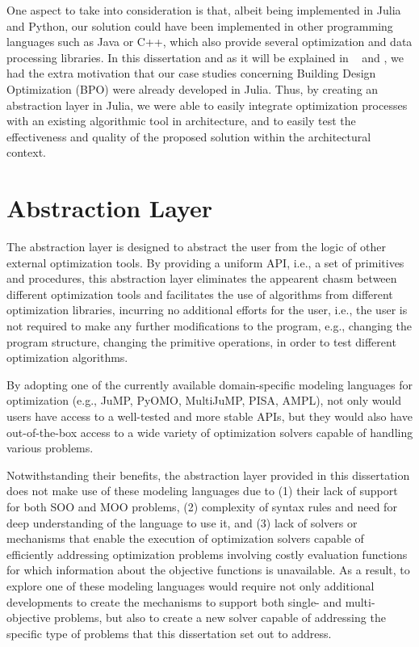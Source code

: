 One aspect to take into consideration is that, albeit being implemented in Julia and Python, our solution could have been implemented in other programming languages such as Java or C++, which also provide several optimization and data processing libraries. In this dissertation and as it will be explained in ~ and , we had the extra motivation that our case studies concerning Building Design Optimization (BPO) were already developed in Julia. Thus, by creating an abstraction layer in Julia, we were able to easily integrate optimization processes with an existing algorithmic tool in architecture, and to easily test the effectiveness and quality of the proposed solution within the architectural context. 

\section{Abstraction Layer}

The abstraction layer is designed to abstract the user from the logic of other external optimization tools. By providing a uniform \ac{API}, i.e., a set of primitives and procedures, this abstraction layer eliminates the appearent chasm between different optimization tools and facilitates the use of algorithms from different optimization libraries, incurring no additional efforts for the user, i.e., the user is not required to make any further modifications to the program, e.g., changing the program structure, changing the primitive operations, in order to test different optimization algorithms. 

By adopting one of the currently available domain-specific modeling languages for optimization (e.g., JuMP, PyOMO, MultiJuMP, PISA, AMPL), not only would users have access to a well-tested and more stable \acp{API}, but they would also have out-of-the-box access to a wide variety of optimization solvers capable of handling various problems. 

Notwithstanding their benefits, the abstraction layer provided in this dissertation does not make use of these modeling languages due to (1) their lack of support for both \ac{SOO} and \ac{MOO} problems, (2) complexity of syntax rules and need for deep understanding of the language to use it, and (3) lack of solvers or mechanisms that enable the execution of optimization solvers capable of efficiently addressing optimization problems involving costly evaluation functions for which information about the objective functions is unavailable. As a result, to explore one of these modeling languages would require not only additional developments to create the mechanisms to support both single- and multi-objective problems, but also to create a new solver capable of addressing the specific type of problems that this dissertation set out to address. 

